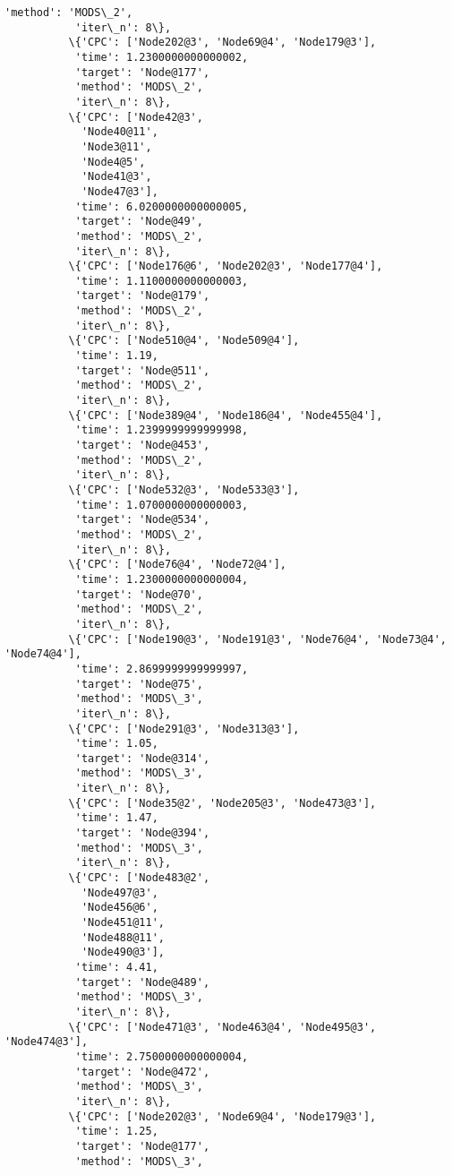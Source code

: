 \documentclass[11pt]{article}
\begin{document}
\begin{Verbatim}[commandchars=\\\{\}]
           'method': 'MODS\_2',
           'iter\_n': 8\},
          \{'CPC': ['Node202@3', 'Node69@4', 'Node179@3'],
           'time': 1.2300000000000002,
           'target': 'Node@177',
           'method': 'MODS\_2',
           'iter\_n': 8\},
          \{'CPC': ['Node42@3',
            'Node40@11',
            'Node3@11',
            'Node4@5',
            'Node41@3',
            'Node47@3'],
           'time': 6.0200000000000005,
           'target': 'Node@49',
           'method': 'MODS\_2',
           'iter\_n': 8\},
          \{'CPC': ['Node176@6', 'Node202@3', 'Node177@4'],
           'time': 1.1100000000000003,
           'target': 'Node@179',
           'method': 'MODS\_2',
           'iter\_n': 8\},
          \{'CPC': ['Node510@4', 'Node509@4'],
           'time': 1.19,
           'target': 'Node@511',
           'method': 'MODS\_2',
           'iter\_n': 8\},
          \{'CPC': ['Node389@4', 'Node186@4', 'Node455@4'],
           'time': 1.2399999999999998,
           'target': 'Node@453',
           'method': 'MODS\_2',
           'iter\_n': 8\},
          \{'CPC': ['Node532@3', 'Node533@3'],
           'time': 1.0700000000000003,
           'target': 'Node@534',
           'method': 'MODS\_2',
           'iter\_n': 8\},
          \{'CPC': ['Node76@4', 'Node72@4'],
           'time': 1.2300000000000004,
           'target': 'Node@70',
           'method': 'MODS\_2',
           'iter\_n': 8\},
          \{'CPC': ['Node190@3', 'Node191@3', 'Node76@4', 'Node73@4', 'Node74@4'],
           'time': 2.8699999999999997,
           'target': 'Node@75',
           'method': 'MODS\_3',
           'iter\_n': 8\},
          \{'CPC': ['Node291@3', 'Node313@3'],
           'time': 1.05,
           'target': 'Node@314',
           'method': 'MODS\_3',
           'iter\_n': 8\},
          \{'CPC': ['Node35@2', 'Node205@3', 'Node473@3'],
           'time': 1.47,
           'target': 'Node@394',
           'method': 'MODS\_3',
           'iter\_n': 8\},
          \{'CPC': ['Node483@2',
            'Node497@3',
            'Node456@6',
            'Node451@11',
            'Node488@11',
            'Node490@3'],
           'time': 4.41,
           'target': 'Node@489',
           'method': 'MODS\_3',
           'iter\_n': 8\},
          \{'CPC': ['Node471@3', 'Node463@4', 'Node495@3', 'Node474@3'],
           'time': 2.7500000000000004,
           'target': 'Node@472',
           'method': 'MODS\_3',
           'iter\_n': 8\},
          \{'CPC': ['Node202@3', 'Node69@4', 'Node179@3'],
           'time': 1.25,
           'target': 'Node@177',
           'method': 'MODS\_3',

\end{Verbatim}
\end{document}
